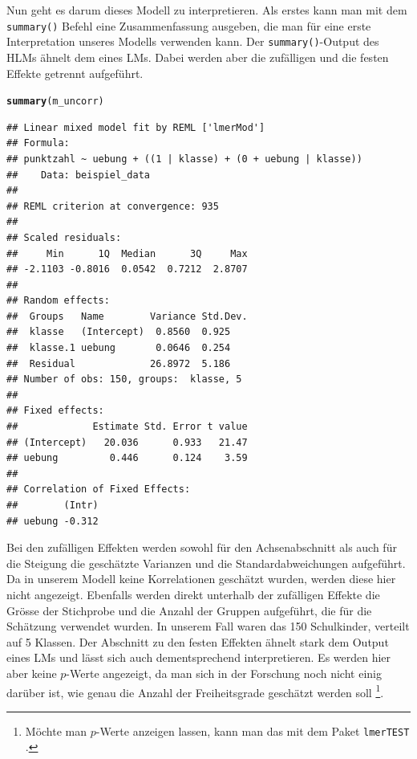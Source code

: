 \documentclass[12pt, a4paper]{article}\usepackage[]{graphicx}\usepackage[]{color}
\makeatletter
\newcommand{\hlstd}[1]{\textcolor[rgb]{0.345,0.345,0.345}{#1}}%
\newcommand{\hlkwd}[1]{\textcolor[rgb]{0.737,0.353,0.396}{\textbf{#1}}}%
\newenvironment{kframe}{%
 \def\at@end@of@kframe{}%
 \ifinner\ifhmode%
  \def\at@end@of@kframe{\end{minipage}}%
  \begin{minipage}{\columnwidth}%
 \fi\fi%
 \def\FrameCommand##1{\hskip\@totalleftmargin \hskip-\fboxsep
 \colorbox{shadecolor}{##1}\hskip-\fboxsep
     \hskip-\linewidth \hskip-\@totalleftmargin \hskip\columnwidth}%
 \MakeFramed {\advance\hsize-\width
   \@totalleftmargin\z@ \linewidth\hsize
   \@setminipage}}%
 {\par\unskip\endMakeFramed%
 \at@end@of@kframe}
\newenvironment{knitrout}{}{} %
\makeatother
\begin{document}
Nun geht es darum dieses Modell zu interpretieren. Als erstes kann man mit dem \texttt{summary()} Befehl eine Zusammenfassung ausgeben, die man für eine erste Interpretation unseres Modells verwenden kann. Der \texttt{summary()}-Output des HLMs ähnelt dem eines LMs. Dabei werden aber die zufälligen und die festen Effekte getrennt aufgeführt. 

\singlespacing
\begin{knitrout}
\color{fgcolor}\begin{kframe}
\begin{alltt}
\hlkwd{summary}\hlstd{(m_uncorr)}
\end{alltt}
\begin{verbatim}
## Linear mixed model fit by REML ['lmerMod']
## Formula: 
## punktzahl ~ uebung + ((1 | klasse) + (0 + uebung | klasse))
##    Data: beispiel_data
## 
## REML criterion at convergence: 935
## 
## Scaled residuals: 
##     Min      1Q  Median      3Q     Max 
## -2.1103 -0.8016  0.0542  0.7212  2.8707 
## 
## Random effects:
##  Groups   Name        Variance Std.Dev.
##  klasse   (Intercept)  0.8560  0.925   
##  klasse.1 uebung       0.0646  0.254   
##  Residual             26.8972  5.186   
## Number of obs: 150, groups:  klasse, 5
## 
## Fixed effects:
##             Estimate Std. Error t value
## (Intercept)   20.036      0.933   21.47
## uebung         0.446      0.124    3.59
## 
## Correlation of Fixed Effects:
##        (Intr)
## uebung -0.312
\end{verbatim}
\end{kframe}
\end{knitrout}


Bei den zufälligen Effekten werden sowohl für den Achsenabschnitt als auch für die Steigung die geschätzte Varianzen und die Standardabweichungen aufgeführt. Da in unserem Modell keine Korrelationen geschätzt wurden, werden diese hier nicht angezeigt. Ebenfalls werden direkt unterhalb der zufälligen Effekte die Grösse der Stichprobe und die Anzahl der Gruppen aufgeführt, die für die Schätzung verwendet wurden. In unserem Fall waren das 150 Schulkinder, verteilt auf 5 Klassen. Der Abschnitt zu den festen Effekten ähnelt stark dem Output eines LMs und lässt sich auch dementsprechend interpretieren. Es werden hier aber keine $p$-Werte angezeigt, da man sich in der Forschung noch nicht einig darüber ist, wie genau die Anzahl der Freiheitsgrade geschätzt werden soll \citep{PEUGH201085,SnijdersTomA.B2012Ma:a}\footnote{Möchte man $p$-Werte anzeigen lassen, kann man das mit dem Paket \texttt{lmerTEST} \citep{lmertest}.}. 
\end{document}
